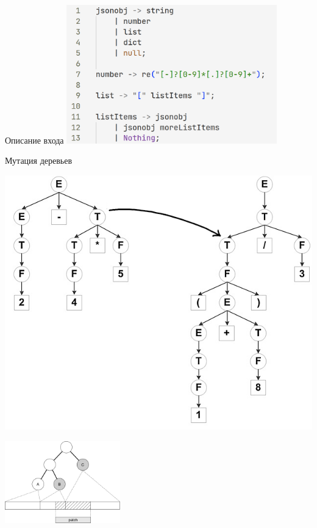 \documentclass[hyperref={unicode=true}, 12pt]{beamer}
\begin{document}
	\begin{frame}[c]{Описание входа}
		\centering \includegraphics[height=6cm]{grammar.png}
	\end{frame}

	\begin{frame}[t]{Мутация деревьев}
		\begin{minipage}{0.5\textwidth}
			
			\vspace{1.5cm}
			
			\includegraphics{tree-mutate.png}
			
		\end{minipage}\begin{minipage}{0.5\textwidth}
			
			\includegraphics[width=5cm]{tree-modification.png}
		\end{minipage}
	\end{frame}
\end{document}
